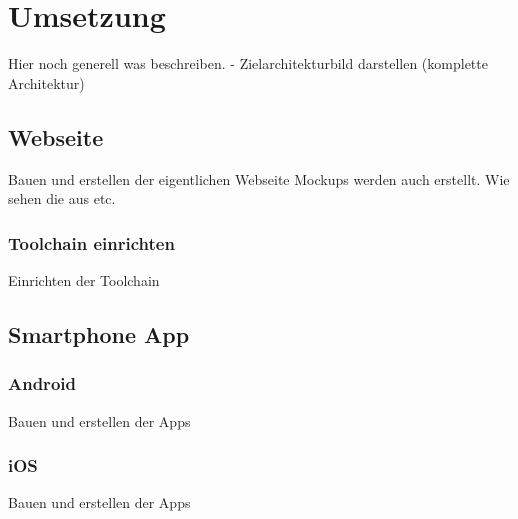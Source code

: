 \section{Umsetzung}
Hier noch generell was beschreiben. - Zielarchitekturbild darstellen (komplette Architektur)

\subsection{Webseite}
Bauen und erstellen der eigentlichen Webseite
Mockups werden auch erstellt. Wie sehen die aus etc.

\subsubsection{Toolchain einrichten}
Einrichten der Toolchain

\subsection{Smartphone App}

\subsubsection{Android}
Bauen und erstellen der Apps

\subsubsection{iOS}
Bauen und erstellen der Apps